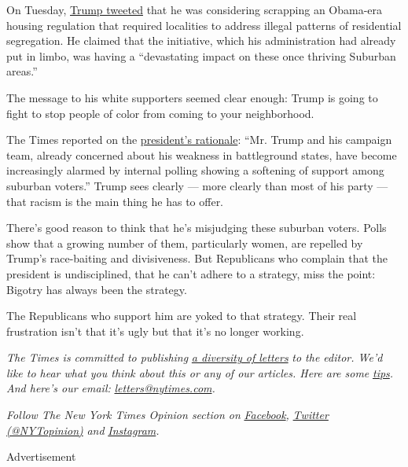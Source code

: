 On Tuesday,
\href{https://twitter.com/realDonaldTrump/status/1278136326647406593?s=20}{Trump
tweeted} that he was considering scrapping an Obama-era housing
regulation that required localities to address illegal patterns of
residential segregation. He claimed that the initiative, which his
administration had already put in limbo, was having a ``devastating
impact on these once thriving Suburban areas.''

The message to his white supporters seemed clear enough: Trump is going
to fight to stop people of color from coming to your neighborhood.

The Times reported on the
\href{https://www.nytimes.com/2020/07/01/us/politics/trump-obama-housing-discrimination.html?action=click\&module=Top\%20Stories\&pgtype=Homepage}{president's
rationale}: ``Mr. Trump and his campaign team, already concerned about
his weakness in battleground states, have become increasingly alarmed by
internal polling showing a softening of support among suburban voters.''
Trump sees clearly --- more clearly than most of his party --- that
racism is the main thing he has to offer.

There's good reason to think that he's misjudging these suburban voters.
Polls show that a growing number of them, particularly women, are
repelled by Trump's race-baiting and divisiveness. But Republicans who
complain that the president is undisciplined, that he can't adhere to a
strategy, miss the point: Bigotry has always been the strategy.

The Republicans who support him are yoked to that strategy. Their real
frustration isn't that it's ugly but that it's no longer working.

\emph{The Times is committed to publishing}
\href{https://www.nytimes.com/2019/01/31/opinion/letters/letters-to-editor-new-york-times-women.html}{\emph{a
diversity of letters}} \emph{to the editor. We'd like to hear what you
think about this or any of our articles. Here are some}
\href{https://help.nytimes.com/hc/en-us/articles/115014925288-How-to-submit-a-letter-to-the-editor}{\emph{tips}}\emph{.
And here's our email:}
\href{mailto:letters@nytimes.com}{\emph{letters@nytimes.com}}\emph{.}

\emph{Follow The New York Times Opinion section on}
\href{https://www.facebook.com/nytopinion}{\emph{Facebook}}\emph{,}
\href{http://twitter.com/NYTOpinion}{\emph{Twitter (@NYTopinion)}}
\emph{and}
\href{https://www.instagram.com/nytopinion/}{\emph{Instagram}}\emph{.}

Advertisement


